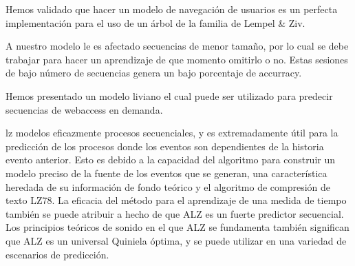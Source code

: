 Hemos validado que hacer un modelo de navegación de usuarios es un perfecta implementación para el uso de un árbol de la familia de Lempel \& Ziv.

A nuestro modelo le es afectado secuencias de menor tamaño, por lo cual se debe trabajar para hacer un aprendizaje de que momento omitirlo o no. Estas sesiones de bajo número de secuencias genera un bajo porcentaje de accurracy. 



Hemos presentado un modelo liviano el cual puede ser utilizado para predecir secuencias de webaccess en demanda.










%

lz modelos eficazmente procesos secuenciales, y es extremadamente útil para la predicción de los procesos donde los eventos son dependientes de la historia evento anterior. Esto es debido a la capacidad del algoritmo para construir un modelo preciso de la fuente de los eventos que se generan, una característica heredada de su información de fondo teórico y el algoritmo de compresión de texto LZ78.
%
La eficacia del método para el aprendizaje de una medida de tiempo también se puede atribuir a hecho de que ALZ es un fuerte predictor secuencial. Los principios teóricos de sonido en el que ALZ se fundamenta también significan que ALZ es un universal Quiniela óptima, y se puede utilizar en una variedad de escenarios de predicción.
%

